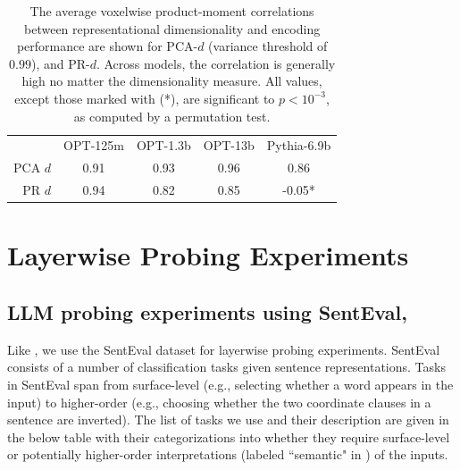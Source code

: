 \documentclass{article}
\theoremstyle{plain}
\theoremstyle{definition}
\theoremstyle{remark}
\begin{document}
\begin{table}[h!]
    \label{tab:pca}
    \caption{The average voxelwise product-moment correlations between representational dimensionality and encoding performance are shown for PCA-$d$ (variance threshold of $0.99$), and PR-$d$. Across models, the correlation is generally high no matter the dimensionality measure. All values, except those marked with (*), are significant to $p < 10^{-3}$, as computed by a permutation test.}
    \centering
    \begin{tabular}{r|cccc}
            & OPT-125m & OPT-1.3b & OPT-13b & Pythia-6.9b \\
        PCA $d$ &  0.91 & 0.93 & 0.96 & 0.86\\ 
        PR $d$ & 0.94 & 0.82 & 0.85 & -0.05* \\
    \end{tabular}
\end{table}

\section{Layerwise Probing Experiments}
\label{app:probing}
\setcounter{figure}{0}    
\setcounter{table}{0} 

\subsection{LLM probing experiments using SentEval, \citet{conneau-etal-2018-cram}}
Like \citet{cheng2025emergence,baroni2026tracingcomplexityprofilesdifferent}, we use the SentEval dataset \citep{conneau-etal-2018-cram} for layerwise probing experiments. SentEval consists of a number of classification tasks given sentence representations. Tasks in SentEval span from surface-level (e.g., selecting whether a word appears in the input) to higher-order (e.g., choosing whether the two coordinate clauses in a sentence are inverted). The list of tasks we use and their description are given in the below table with their categorizations into whether they require surface-level or potentially higher-order interpretations (labeled ``semantic" in ) of the inputs.
\end{document}

